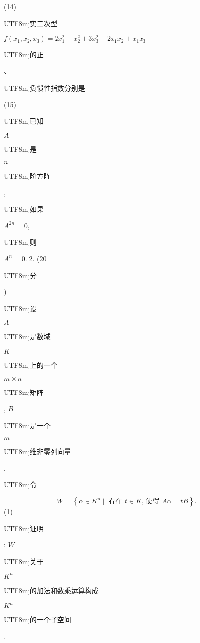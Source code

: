\documentclass[10pt]{article}
\begin{document}
(14) \begin{CJK}{UTF8}{mj}实二次型\end{CJK} $f\left(x_{1}, x_{2}, x_{3}\right)=2 x_{1}^{2}-x_{2}^{2}+3 x_{3}^{2}-2 x_{1} x_{2}+x_{1} x_{3}$ \begin{CJK}{UTF8}{mj}的正\end{CJK}、\begin{CJK}{UTF8}{mj}负惯性指数分别是\end{CJK}

(15) \begin{CJK}{UTF8}{mj}已知\end{CJK} $A$ \begin{CJK}{UTF8}{mj}是\end{CJK} $n$ \begin{CJK}{UTF8}{mj}阶方阵\end{CJK}, \begin{CJK}{UTF8}{mj}如果\end{CJK} $A^{2 n}=0$, \begin{CJK}{UTF8}{mj}则\end{CJK} $A^{n}=0$. 2. (20 \begin{CJK}{UTF8}{mj}分\end{CJK}) \begin{CJK}{UTF8}{mj}设\end{CJK} $A$ \begin{CJK}{UTF8}{mj}是数域\end{CJK} $K$ \begin{CJK}{UTF8}{mj}上的一个\end{CJK} $m \times n$ \begin{CJK}{UTF8}{mj}矩阵\end{CJK}, $B$ \begin{CJK}{UTF8}{mj}是一个\end{CJK} $m$ \begin{CJK}{UTF8}{mj}维非零列向量\end{CJK}. \begin{CJK}{UTF8}{mj}令\end{CJK}
$$
W=\left\{\alpha \in K^{n} \mid \text { 存在 } t \in K \text {, 使得 } A \alpha=t B\right\} \text {. }
$$
(1) \begin{CJK}{UTF8}{mj}证明\end{CJK}: $W$ \begin{CJK}{UTF8}{mj}关于\end{CJK} $K^{n}$ \begin{CJK}{UTF8}{mj}的加法和数乘运算构成\end{CJK} $K^{n}$ \begin{CJK}{UTF8}{mj}的一个子空间\end{CJK}.
\end{document}
